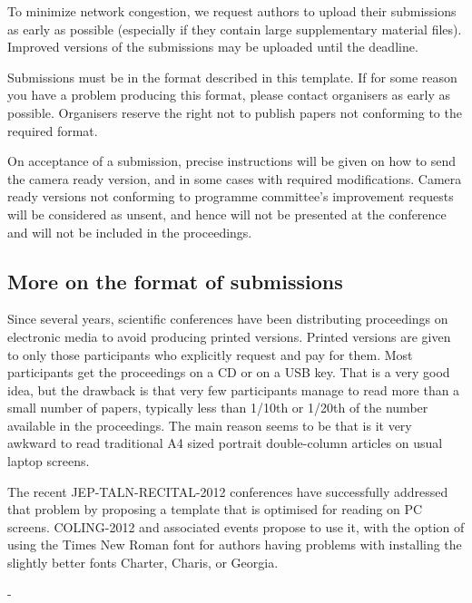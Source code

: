 \documentclass[10pt,a5paper,twoside]{article}
\begin{document}
To minimize network congestion, we request authors to upload their submissions as early as possible (especially if they contain large supplementary material files). Improved versions of the submissions may be uploaded until the deadline.

Submissions must be in the format described in this template. If for some reason you have a problem producing this format, please contact organisers as early as possible. Organisers reserve the right not to publish papers not conforming to the required format.

On acceptance of a submission, precise instructions will be given on how to send the camera ready version, and in some cases with required modifications. Camera ready versions not conforming to programme committee’s improvement requests will be considered as unsent, and hence will not be presented at the conference and will not be included in the proceedings.
\subsection{More on the format of submissions}
Since several years, scientific conferences have been distributing proceedings on electronic media to avoid producing printed versions. Printed versions are given to only those participants who explicitly request and pay for them. Most participants get the proceedings on a CD or on a USB key. That is a very good idea, but the drawback is that very few participants manage to read more than a small number of papers, typically less than 1/10th or 1/20th of the number available in the proceedings. The main reason seems to be that is it very awkward to read traditional A4 sized portrait double-column articles on usual laptop screens. 

The recent JEP-TALN-RECITAL-2012 conferences have successfully addressed that problem by proposing a template that is optimised for reading on PC screens. COLING-2012 and associated events propose to use it, with the option of using the Times New Roman font for authors having problems with installing the slightly better fonts Charter, Charis, or Georgia. 

-
\end{document}
